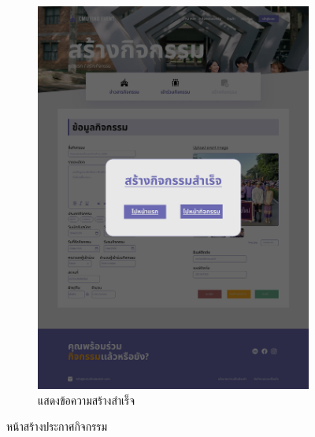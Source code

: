 \begin{figure}[h]
\begin{subfigure}[b]{0.3\linewidth}
    \includegraphics[width=\linewidth]{image/Figma-design/Create-event-info-1.png}
    \caption{แสดงข้อความสร้างสำเร็จ}
  \end{subfigure}
  \caption{หน้าสร้างประกาศกิจกรรม}
  \label{fig:create-event-info}
\end{figure}

